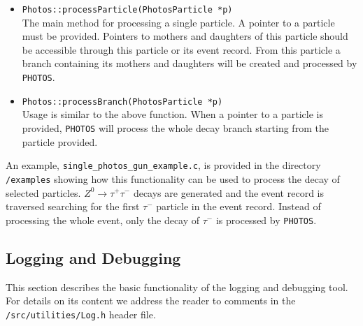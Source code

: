 \documentclass[]{Photos_interface_design}
\begin{document}
\begin{itemize}
  \item {\tt Photos::processParticle(PhotosParticle *p) } \hfill \\
		The main method for processing a single particle. A pointer to a particle must
		be provided. Pointers to mothers and daughters of this particle should be
		accessible through this particle or its event record.
		From this particle a branch containing its mothers and daughters
		will be created and processed by {\tt PHOTOS}.
  \item {\tt Photos::processBranch(PhotosParticle *p) } \hfill \\
		Usage is similar to the above function. When a pointer to a particle is provided,
		{\tt PHOTOS} will process the whole decay branch starting from the particle provided.
\end{itemize}

An example, {\tt single\_photos\_gun\_example.c}, is provided in the directory {\tt /examples}
showing how this functionality can be used to process the decay of selected particles.
$Z^0 \rightarrow \tau^+ \tau^-$ decays are generated and the event record is traversed
searching for the first $\tau^-$ particle in the event record.
Instead of processing the whole event, only the decay of $\tau^-$ is processed by {\tt PHOTOS}.


\subsection{Logging and Debugging}
\label{App:Logging}
This section describes the basic functionality of the logging and debugging tool.
For details on its content we address the reader to comments in the {\tt /src/utilities/Log.h} header file.
\end{document}
